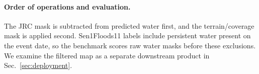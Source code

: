 \paragraph{Order of operations and evaluation.}
The JRC mask is subtracted from predicted water first, and the
terrain/coverage mask is applied second. Sen1Floods11 labels include
persistent water present on the event date, so the benchmark scores raw
water masks before these exclusions. We examine the filtered map as a
separate downstream product in Sec.~\ref{sec:deployment}.
